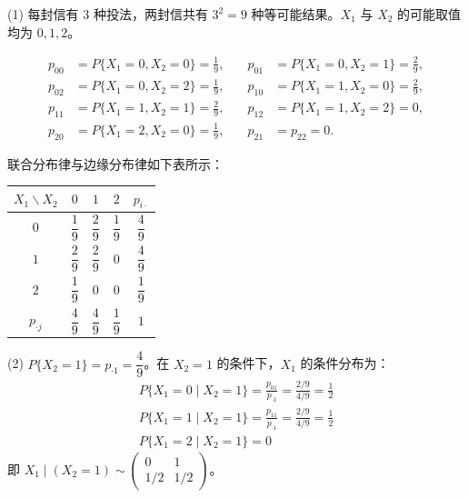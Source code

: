 \documentclass[lang=cn,11pt]{elegantbook}
\begin{document}
\begin{solution}
(1) 每封信有 3 种投法，两封信共有 $3^2 = 9$ 种等可能结果。$X_1$ 与 $X_2$ 的可能取值均为 $0, 1, 2$。

\[
\begin{aligned}
p_{00} &= P\{X_1=0, X_2=0\} = \frac{1}{9}, &\quad p_{01} &= P\{X_1=0, X_2=1\} = \frac{2}{9}, \\
p_{02} &= P\{X_1=0, X_2=2\} = \frac{1}{9}, &\quad p_{10} &= P\{X_1=1, X_2=0\} = \frac{2}{9}, \\
p_{11} &= P\{X_1=1, X_2=1\} = \frac{2}{9}, &\quad p_{12} &= P\{X_1=1, X_2=2\} = 0, \\
p_{20} &= P\{X_1=2, X_2=0\} = \frac{1}{9}, &\quad p_{21} &= p_{22} = 0.
\end{aligned}
\]

联合分布律与边缘分布律如下表所示：

\begin{center}
\begin{tabular}{c|ccc|c}
\toprule
$X_1 \backslash X_2$ & $0$ & $1$ & $2$ & $p_{i\cdot}$ \\
\midrule
$0$ & $\dfrac{1}{9}$ & $\dfrac{2}{9}$ & $\dfrac{1}{9}$ & $\dfrac{4}{9}$ \\[6pt]
$1$ & $\dfrac{2}{9}$ & $\dfrac{2}{9}$ & $0$ & $\dfrac{4}{9}$ \\[6pt]
$2$ & $\dfrac{1}{9}$ & $0$ & $0$ & $\dfrac{1}{9}$ \\
\midrule
$p_{\cdot j}$ & $\dfrac{4}{9}$ & $\dfrac{4}{9}$ & $\dfrac{1}{9}$ & $1$ \\
\bottomrule
\end{tabular}
\end{center}

(2) $P\{X_2=1\} = p_{\cdot 1} = \dfrac{4}{9}$。在 $X_2 = 1$ 的条件下，$X_1$ 的条件分布为：
\begin{align*}
P\{X_1=0 \mid X_2=1\} = \frac{p_{01}}{p_{\cdot 1}} = \frac{2/9}{4/9} = \frac{1}{2}\\
P\{X_1=1 \mid X_2=1\} = \frac{p_{11}}{p_{\cdot 1}} = \frac{2/9}{4/9} = \frac{1}{2}\\
P\{X_1=2 \mid X_2=1\} = 0
\end{align*}
即 $X_1 \mid (X_2=1) \sim \begin{pmatrix} 0 & 1 \\ 1/2 & 1/2 \end{pmatrix}$。
\end{solution}
\end{document}
